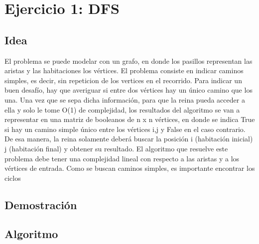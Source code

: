 \documentclass[a4paper]{article}
\begin{document}

\maketitle

\section{Ejercicio 1: DFS}



\subsection{Idea}
El problema se puede modelar con un grafo, en donde los pasillos representan las aristas y las habitaciones los vértices. El problema consiste en indicar caminos simples, es decir, sin repeticion de los vertices en el recorrido. Para indicar un buen desafío, hay que averiguar si entre dos vértices hay un único camino que los una. 
Una vez que se sepa dicha información, para que la reina pueda acceder a ella y solo le tome O(1) de complejidad, los resultados del algoritmo se van a representar en una matriz de booleanos de n x n vértices, en donde se indica True si hay un camino simple único entre los vértices i,j y False en el caso contrario. De esa manera, la reina solamente deberá buscar la posición i (habitación inicial) j (habitación final) y obtener su resultado.
El algoritmo que resuelve este problema debe tener una complejidad lineal con respecto a las aristas y a los vértices de entrada. Como se buscan caminos simples, es importante encontrar los ciclos 


\subsection{Demostración}

\subsection{Algoritmo}
\end{document}

